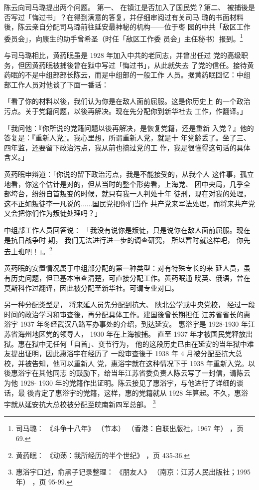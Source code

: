 陈云向司马璐提出两个问题。
第一、
在镇江是否加入了国民党？第二、
被捕後是否写过「悔过书」？在得到满意的答复，并仔细审阅过有关司马
璐的书面材料後，陈云亲自分配司马璐前往延安最神秘的机构——位于枣
园的中共「敌区工作委员会」，向康生的助手曾希圣（时任「敌区工作委
员会」主任秘书）报到。\footnote{司马璐：
《斗争十八年》
（节本）
（香港：自联出版社，1967 年）
，页 69. }

与司马璐相比，黄药眠虽是 1928 年加入中共的老同志，并曾出任过
党的高级职务，但因黄药眠被捕後曾在狱中写过「悔过书」，从此就失去
了党的信任。接待黄药眠的不是中组部部长陈云，而是中组部的一般工作
人员。据黄药眠回忆：中组部工作人员对他谈了下面一番话：

「看了你的材料以後，我们认为你是在敌人面前屈服。这是你历史上
的一个政治污点。关于党籍问题，以後再解决。现在先分配你到新华社去
工作，作翻译。」

「我问他：『你所说的党籍问题以後再解决，是恢复党籍，还是重新
入党？』他的答复是：『重新人党』。我心里想，所谓重新人党，就是十
年党龄丢了。坐了三、四年监，还要留下政治污点，我从前也搞过党的工
作，我是很懂得这句话的具体含义。」

黄药眠申辩道：「你说的留下政治污点，我是不能接受的，从我个人
这件事，孤立地看，你这个估计是对的，但从当时的整个形势看，上海党、
团中央局，几乎全部垮台，纷纷自首叛变的时候，就只有我一人判处十年
徒刑，现在对我的处理，这不正如叛徒李一凡说的......国民党把你们当作
共产党来军法处理，而将来共产党又会把你们作为叛徒处理吗？」

中组部工作人员回答说：
「我没有说你是叛徒，只是说你在敌人面前屈服。现在是抗日战争时
期，
我们无法进行进一步的调查研究，
所以暂时就这样吧，
你先去上班吧！」。\footnote{黄药眠：
《动荡：我所经历的半个世纪》
，页 435-36. }


黄药眠的安置情况属于中组部分配的第一种类型：对有特殊专长的来
延人员，虽有历史问题，但已基本审查清楚，可直接分配工作。黄药眠通
晓英、俄语，曾在莫斯科作过翻译，因此被分配至新华社。可谓专业对口。

另一种分配类型是，
将来延人员先分配到抗大、
陕北公学或中央党校，
经过一段时间的政治学习和审查後，再分配具体工作。建国後曾长期担任
江苏省省长的惠浴宇 1937 年冬经武汉八路军办事处的介绍，到达延安。
惠浴宇是 1928-1930 年江苏省海州地区党的领导人，
1930 年在上海被捕。
直至 1937 年才被国民党释放出狱。惠在狱中无任何「自首」、变节行为，
他的这段历史已由在延安的当年狱中难友提出证明，因此惠浴宇在经历了
一段审查後于 1938 年 4 月被分配至抗大总校，并被告知，他可以重新人
党，惠浴宇就在这种情况下于 1938 年重新入党。以後惠浴宇在其他同志
的鼓励下，给当年江苏省委负责人陈云写了一封信，请陈云为他 1928-
1930 年的党籍作出证明。陈云接见了惠浴宇，与他进行了详细的谈话，最
後肯定了惠浴宇的党籍，这样，惠的党籍就从 1928 年算起。不久，惠浴
宇就从延安抗大总校被分配至皖南新四军总部。
\footnote{惠浴宇口述，俞黑子记录整理：
《朋友人》
（南京：江苏人民出版社；1995 年）
，页 95-99. 
}

